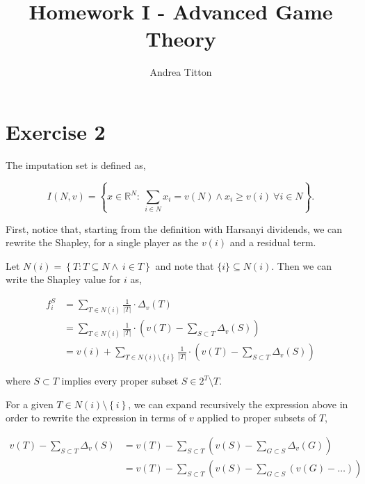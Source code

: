 \documentclass[american]{scrartcl}
\title{Homework I - Advanced Game Theory }
\author{Andrea Titton}
\newcommand{\set}[1]{\left\{#1\right\}}
\newcommand{\Real}{\mathbb{R}}
\newcommand{\abs}[1]{\left\lvert #1 \right\rvert}
\begin{document}

\maketitle
\newpage

\section*{Exercise 2}

The imputation set is defined as,

\begin{equation}
    I(N, v) = \set{ x \in \Real^N: \ \sum_{i \in N} x_i = v(N) \land x_i \geq v(i) \ \forall i \in N }.
\end{equation}

First, notice that, starting from the definition with Harsanyi dividends, we can rewrite the Shapley, for a single player as the $v(i)$ and a residual term.

Let $N(i) = \set{T: T \subseteq N \land \ i \in T}$ and note that $\{i\} \subseteq N(i)$. Then we can write the Shapley value for $i$ as,

\begin{equation}
    \begin{split}
        f^S_i &= \sum_{T \in N(i)} \frac{1}{\abs{T}} \cdot \Delta_v(T)\\
        &=  \sum_{T \in N(i)} \frac{1}{\abs{T}} \cdot \left( v(T) - \sum_{S \subset T} \Delta_v(S) \right) \\
        &= v(i) + \sum_{T \in N(i) \setminus \set{i} } \frac{1}{\abs{T}} \cdot \left( v(T) - \sum_{S \subset T} \Delta_v(S) \right)
    \end{split}
\end{equation}

where $S \subset T$ implies every proper subset $S \in 2^T \setminus T$.

For a given $T \in N(i)\setminus\set{i}$, we can expand recursively the expression above in order to rewrite the expression in terms of $v$ applied to proper subsets of $T$,

\begin{equation}
    \begin{split}
        v(T) - \sum_{S \subset T} \Delta_v(S) &= v(T) - \sum_{S \subset T} \left(v(S) - \sum_{G \subset S} \Delta_v(G) \right) \\
        &= v(T) - \sum_{S \subset T} \left( v(S)- \sum_{G \subset S} \left(v(G) - \ldots\right) \right)
    \end{split}
\end{equation}
\end{document}
